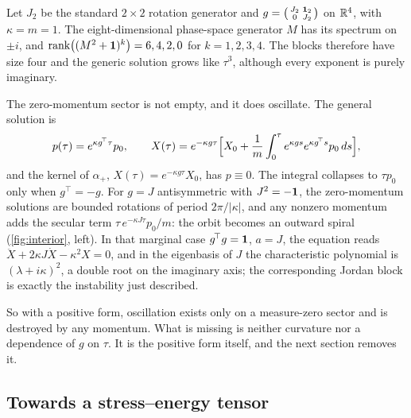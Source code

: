 \begin{example}
\label{ex:jordan4}
Let $J_2$ be the standard $2\times2$ rotation generator and $g=\bigl(\begin{smallmatrix}J_2&\mathbf 1_2\\0&J_2\end{smallmatrix}\bigr)$ on $\mathbb{R}^4$, with
$\kappa=m=1$. The eight-dimensional phase-space generator $M$ has its spectrum on $\pm i$, and
$\operatorname{rank}\bigl((M^2+\mathbf 1)^k\bigr)=6,4,2,0$ for $k=1,2,3,4$. The blocks therefore have size four and the generic solution grows like $\tau^3$, although
every exponent is purely imaginary.
\end{example}

The zero-momentum sector is not empty, and it does oscillate. The general solution is
\begin{equation}
\label{eq:gensol}
p(\tau)=e^{\kappa g^{\!\top}\tau}p_0,\qquad X(\tau)=e^{-\kappa g\tau}\Bigl[X_0+\frac1m\int_0^\tau e^{\kappa gs}e^{\kappa g^{\!\top}s}p_0\,ds\Bigr],
\end{equation}
and the kernel of $\alpha_+$, $X(\tau)=e^{-\kappa g\tau}X_0$, has $p\equiv0$. The integral collapses to $\tau p_0$ only when $g^{\!\top}=-g$. For
$g=J$ antisymmetric with $J^2=-\mathbf 1$, the zero-momentum solutions are bounded rotations of period $2\pi/|\kappa|$, and any nonzero momentum
adds the secular term $\tau\,e^{-\kappa J\tau}p_0/m$: the orbit becomes an outward spiral (\cref{fig:interior}, left). In that marginal case
$g^{\!\top}g=\mathbf 1$, $a=J$, the equation reads $\ddot X+2\kappa J\dot X-\kappa^2X=0$, and in the eigenbasis of $J$ the characteristic polynomial is
$(\lambda+i\kappa)^2$, a double root on the imaginary axis; the corresponding Jordan block is exactly the instability just described.

So with a positive form, oscillation exists only on a measure-zero sector and is destroyed by any momentum. What is missing is neither
curvature nor a dependence of $g$ on $\tau$. It is the positive form itself, and the next section removes it.

\subsection{Towards a stress--energy tensor}

